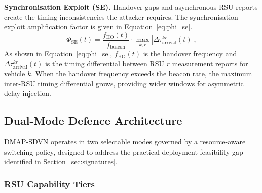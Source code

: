 \textbf{Synchronisation Exploit (SE).} Handover gaps and
asynchronous RSU reports create the timing inconsistencies
the attacker requires. The synchronisation exploit amplification
factor is given in Equation~\eqref{eq:phi_se}.
\begin{equation}
\Phi_{\mathrm{SE}}(t) = \frac{f_{\mathrm{HO}}(t)}{f_{\mathrm{beacon}}}
  \cdot\max_{k,r}|\Delta\tau_{\mathrm{arrival}}^{kr}(t)|,
\label{eq:phi_se}
\end{equation}
As shown in Equation~\eqref{eq:phi_se}, $f_{\mathrm{HO}}(t)$
is the handover frequency and
$\Delta\tau_{\mathrm{arrival}}^{kr}(t)$ is the timing differential
between RSU $r$ measurement reports for vehicle $k$. When the
handover frequency exceeds the beacon rate, the maximum
inter-RSU timing differential grows, providing wider windows
for asymmetric delay injection.

\subsection{Dual-Mode Defence Architecture}
\label{sec:dualmode}

DMAP-SDVN operates in two selectable modes governed by a
resource-aware switching policy, designed to address the practical
deployment feasibility gap identified in Section~\ref{sec:signatures}.


\subsubsection{RSU Capability Tiers}
\label{sec:rsu_tiers}

